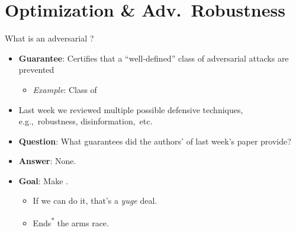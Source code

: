 \section{Optimization \& Adv.\ Robustness}


\begin{frame}{What is an adversarial ?}
  \begin{itemize}[<+->]
    \setlength{\itemsep}{20pt}
    \item \textbf{Guarantee}: Certifies that a ``well-defined'' class of adversarial attacks are prevented
      \begin{itemize}
        \item \textit{Example}: Class of \textbf{}
      \end{itemize}

    \item Last week we reviewed multiple possible defensive techniques, e.g.,~robustness, disinformation,~etc.

    \item \textbf{Question}: What guarantees did the authors' of last week's paper provide?
    \vspace{-14pt}
    \item \textbf{Answer}: None. 

    \item \textbf{Goal}: Make \textbf{}.
      \begin{itemize}[<+->]
        \item If we can do it, that's a \textit{yuge} deal.
        \item Ends\textsuperscript{*} the arms race.
      \end{itemize}
  \end{itemize}
\end{frame}


